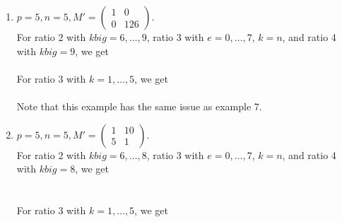 \documentclass[letterpaper,12pt]{article}
\begin{document}
\begin{enumerate}
\item $p=5, n=5, M' = \begin{pmatrix}
1 & 0 \\ 0 & 126
\end{pmatrix}.$ \\
For ratio 2 with $kbig = 6, \dots, 9$, ratio 3 with $e = 0, \dots, 7$, $k=n$, and ratio 4 with $kbig = 9$, we get \\
 \\
For ratio 3 with $k = 1, \dots, 5$, we get \\
 \\

Note that this example has the same issue as example 7.

\item $p=5, n=5, M' = \begin{pmatrix}
1 & 10 \\ 5 & 1
\end{pmatrix}.$ \\
For ratio 2 with $kbig = 6, \dots, 8$, ratio 3 with $e = 0, \dots, 7$, $k=n$, and ratio 4 with $kbig = 8$, we get \\
 \\
 \\
For ratio 3 with $k = 1, \dots, 5$, we get \\
 \\


\end{enumerate}
\end{document}
